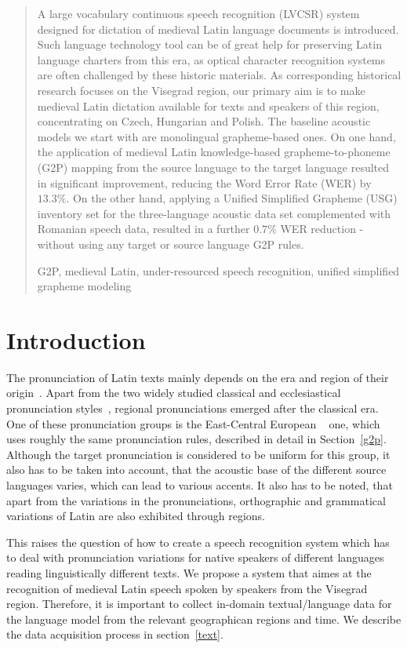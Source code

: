 \documentclass[runningheads,a4paper]{llncs}
\newcommand{\keywords}[1]{\par\addvspace\baselineskip
\noindent\keywordname\enspace\ignorespaces#1}
\begin{document}
%
%
%
%
\begin{abstract}
A large vocabulary continuous speech recognition (LVCSR) system designed for dictation of medieval Latin language documents is introduced.
Such language technology tool can be of great help for preserving Latin language charters from this era, as optical character recognition systems are often challenged by these historic materials.
As corresponding historical research focuses on the Visegrad region, our primary aim is to make medieval Latin dictation available for texts and speakers of this region, concentrating on Czech, Hungarian and Polish.
The baseline acoustic models we start with are monolingual grapheme-based ones. 
On one hand, the application of medieval Latin knowledge-based grapheme-to-phoneme (G2P) mapping from the source language to the target language resulted in significant improvement, reducing the Word Error Rate (WER) by $13.3\%$. 
On the other hand, applying a Unified Simplified Grapheme (USG) inventory set for the three-language acoustic data set complemented with Romanian speech data, resulted in a further $0.7\%$ WER reduction - without using any target or source language G2P rules.
\keywords{G2P, medieval Latin, under-resourced speech recognition, unified simplified grapheme modeling}
\end{abstract}

\section{Introduction}
The pronunciation of Latin texts mainly depends on the era and region of their origin~\cite{regional}.
Apart from the two widely studied classical and ecclesiastical pronunciation styles~\cite{allen78}, regional pronunciations emerged after the classical era.
One of these pronunciation groups is the East-Central European ~\cite{regional} one, which uses roughly the same pronunciation rules, described in detail in Section~\ref{g2p}.
Although the target pronunciation is considered to be uniform for this group, it also has to be taken into account, that the acoustic base of the different source languages varies, which can lead to various accents.
It also has to be noted, that apart from the variations in the pronunciations, orthographic and grammatical variations of Latin are also exhibited through regions.

This raises the question of how to create a speech recognition system which has to deal with pronunciation variations for native speakers of different languages reading linguistically different texts.
We propose a system that aimes at the recognition of medieval Latin speech spoken by speakers from the Visegrad region.
Therefore, it is important to collect in-domain textual/language data for the language model from the relevant geographican regions and time.
We describe the data acquisition process in section~\ref{text}.
\end{document}
